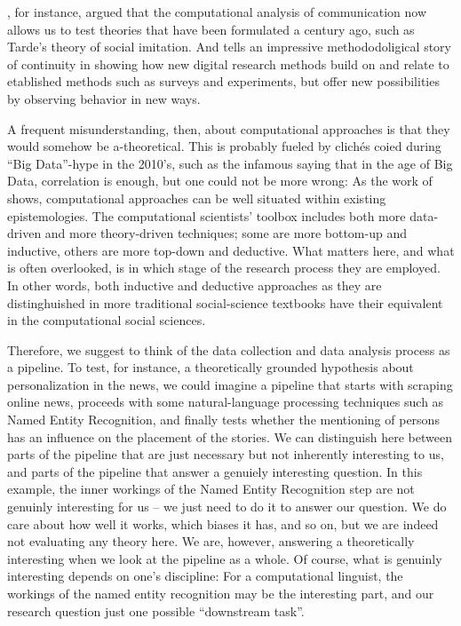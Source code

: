 \citet{Gonzalez-Bailon2017}, for instance, argued that the
computational analysis of communication now allows us to test theories
that have been formulated a century ago, such as Tarde's theory of
social imitation. And \citet{Salganik2019} tells an impressive
methododoligical story of continuity in showing how new digital
research methods build on and relate to etablished methods such as
surveys and experiments, but offer new possibilities by observing
behavior in new ways.

A frequent misunderstanding, then, about computational approaches is
that they would somehow be a-theoretical. This is probably fueled by
clich\'{e}s coied during ``Big Data''-hype in the 2010's, such as the
infamous saying that in the age of Big Data, correlation is enough,
but one could not be more wrong: As the work of \cite{Kitchin2014,Kitchin2014data} shows, computational approaches can
be well situated within existing epistemologies. The computational
scientists' toolbox includes both more data-driven and more
theory-driven techniques; some are more bottom-up and inductive,
others are more top-down and deductive. What matters here, and what is
often overlooked, is in which stage of the research process they are
employed. In other words, both inductive and deductive approaches as
they are distinghuished in more traditional social-science textbooks
\citep[e.g.,][]{Bryman2012} have their equivalent in the computational
social sciences.

Therefore, we suggest to think of the data collection and data
analysis process as a pipeline. To test, for instance, a theoretically
grounded hypothesis about personalization in the news, we could
imagine a pipeline that starts with scraping online news, proceeds
with some natural-language processing techniques such as Named Entity
Recognition, and finally tests whether the mentioning of persons has
an influence on the placement of the stories. We can distinguish here
between parts of the pipeline that are just necessary but not
inherently interesting to us, and parts of the pipeline that answer a
genuiely interesting question. In this example, the inner workings of
the Named Entity Recognition step are not genuinly interesting for us
-- we just need to do it to answer our question. We do care about how
well it works, which biases it has, and so on, but we are indeed not
evaluating any theory here. We are, however, answering a theoretically
interesting when we look at the pipeline as a whole.  Of course, what
is genuinly interesting depends on one's discipline: For a
computational linguist, the workings of the named entity recognition
may be the interesting part, and our research question just one
possible ``downstream task''.

